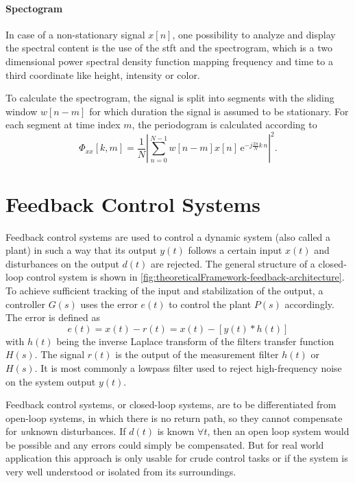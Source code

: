 \paragraph{Spectogram}
In case of a non-stationary signal $x[n]$, one possibility to analyze and display the spectral content is the use of the \gls{stft} and the spectrogram, which is a two dimensional power spectral density function mapping frequency and time to a third coordinate like height, intensity or color.

To calculate the spectrogram, the signal is split into segments with the sliding window $w[n-m]$ for which duration the signal is assumed to be stationary. For each segment at time index $m$, the periodogram is calculated according to
\begin{equation}
\hat{\Phi}_{xx}[k,m] = \frac{1}{N} \left| \sum_{n=0}^{N-1} w[n-m] x[n]\,\text{e}^{-j\frac{2\pi}{N}k\,n}\right|^2.
\end{equation}









\section{Feedback Control Systems}\label{sec:feedbackcontrol}
Feedback control systems are used to control a dynamic system (also called a plant) in such a way that its output $y(t)$ follows a certain input $x(t)$ and disturbances on the output $d(t)$ are rejected. The general structure of a closed-loop control system is shown in \autoref{fig:theoreticalFramework-feedback-architecture}. To achieve sufficient tracking of the input and stabilization of the output, a controller $G(s)$ uses the error $e(t)$ to control the plant $P(s)$ accordingly.
The error is defined as
\begin{equation}
e(t)=x(t)-r(t) = x(t)-[y(t)\ast h(t)]
\end{equation}
with $h(t)$ being the inverse Laplace transform of the filters transfer function $H(s)$. The signal $r(t)$ is the output of the measurement filter $h(t)$ or $H(s)$. It is most commonly a lowpass filter used to reject high-frequency noise on the system output $y(t)$.

Feedback control systems, or closed-loop systems, are to be differentiated from open-loop systems, in which there is no return path, so they cannot compensate for \textit{un}known disturbances. If $d(t)$ is known $\forall t$, then an open loop system would be possible and any errors could simply be compensated. But for real world application this approach is only usable for crude control tasks or if the system is very well understood or isolated from its surroundings.

